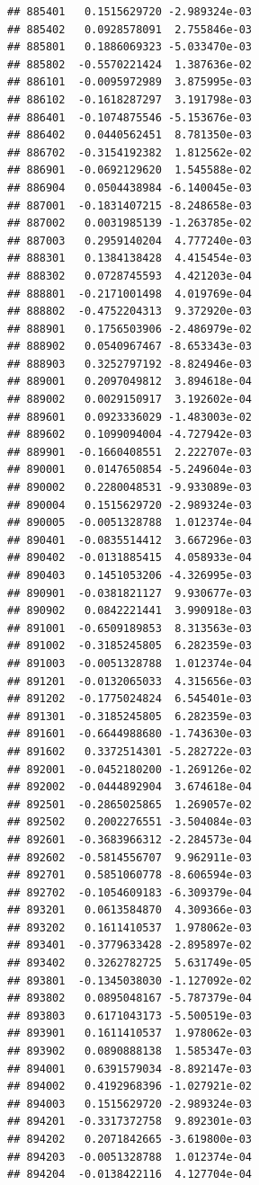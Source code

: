 \begin{frame}[fragile]
\begin{verbatim}
## 885401   0.1515629720 -2.989324e-03
## 885402   0.0928578091  2.755846e-03
## 885801   0.1886069323 -5.033470e-03
## 885802  -0.5570221424  1.387636e-02
## 886101  -0.0095972989  3.875995e-03
## 886102  -0.1618287297  3.191798e-03
## 886401  -0.1074875546 -5.153676e-03
## 886402   0.0440562451  8.781350e-03
## 886702  -0.3154192382  1.812562e-02
## 886901  -0.0692129620  1.545588e-02
## 886904   0.0504438984 -6.140045e-03
## 887001  -0.1831407215 -8.248658e-03
## 887002   0.0031985139 -1.263785e-02
## 887003   0.2959140204  4.777240e-03
## 888301   0.1384138428  4.415454e-03
## 888302   0.0728745593  4.421203e-04
## 888801  -0.2171001498  4.019769e-04
## 888802  -0.4752204313  9.372920e-03
## 888901   0.1756503906 -2.486979e-02
## 888902   0.0540967467 -8.653343e-03
## 888903   0.3252797192 -8.824946e-03
## 889001   0.2097049812  3.894618e-04
## 889002   0.0029150917  3.192602e-04
## 889601   0.0923336029 -1.483003e-02
## 889602   0.1099094004 -4.727942e-03
## 889901  -0.1660408551  2.222707e-03
## 890001   0.0147650854 -5.249604e-03
## 890002   0.2280048531 -9.933089e-03
## 890004   0.1515629720 -2.989324e-03
## 890005  -0.0051328788  1.012374e-04
## 890401  -0.0835514412  3.667296e-03
## 890402  -0.0131885415  4.058933e-04
## 890403   0.1451053206 -4.326995e-03
## 890901  -0.0381821127  9.930677e-03
## 890902   0.0842221441  3.990918e-03
## 891001  -0.6509189853  8.313563e-03
## 891002  -0.3185245805  6.282359e-03
## 891003  -0.0051328788  1.012374e-04
## 891201  -0.0132065033  4.315656e-03
## 891202  -0.1775024824  6.545401e-03
## 891301  -0.3185245805  6.282359e-03
## 891601  -0.6644988680 -1.743630e-03
## 891602   0.3372514301 -5.282722e-03
## 892001  -0.0452180200 -1.269126e-02
## 892002  -0.0444892904  3.674618e-04
## 892501  -0.2865025865  1.269057e-02
## 892502   0.2002276551 -3.504084e-03
## 892601  -0.3683966312 -2.284573e-04
## 892602  -0.5814556707  9.962911e-03
## 892701   0.5851060778 -8.606594e-03
## 892702  -0.1054609183 -6.309379e-04
## 893201   0.0613584870  4.309366e-03
## 893202   0.1611410537  1.978062e-03
## 893401  -0.3779633428 -2.895897e-02
## 893402   0.3262782725  5.631749e-05
## 893801  -0.1345038030 -1.127092e-02
## 893802   0.0895048167 -5.787379e-04
## 893803   0.6171043173 -5.500519e-03
## 893901   0.1611410537  1.978062e-03
## 893902   0.0890888138  1.585347e-03
## 894001   0.6391579034 -8.892147e-03
## 894002   0.4192968396 -1.027921e-02
## 894003   0.1515629720 -2.989324e-03
## 894201  -0.3317372758  9.892301e-03
## 894202   0.2071842665 -3.619800e-03
## 894203  -0.0051328788  1.012374e-04
## 894204  -0.0138422116  4.127704e-04

\end{verbatim}
\end{frame}
